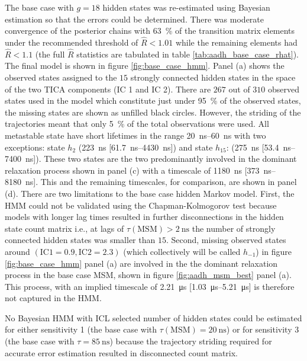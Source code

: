 The base case with $g=18$ hidden states was re-estimated using Bayesian estimation so that the errors could be determined.  There was moderate convergence of the posterior chains with \SI{63}{\percent} of the transition matrix elements under the recommended threshold of $\hat{R}<1.01$ while the remaining elements had $\hat{R}<1.1$ (the full $\hat{R}$ statistics  are tabulated in table \ref{tab:aadh_base_case_rhat}). The final model is shown in figure \ref{fig:base_case_hmm}. Panel (a) shows the observed states assigned to the $15$ strongly connected hidden states in the space of the two TICA components (IC 1 and IC 2). There are $267$ out of $310$ observed states used in the model which constitute just under \SI{95}{\percent} of the observed states, the missing states are shown as unfilled black circles. However, the striding of the trajectories meant that only \SI{5}{\percent} of the total observations were used. All metastable state have short lifetimes in the range \SIrange{20}{60}{\nano\second} with two exceptions: state $h_2$ (\SI{223}{\nano\second} [\SIrange[range-phrase=--]{61.7}{4430}{\nano\second}]) and state $h_{15}$: (\SI{275}{\nano\second} [\SIrange[range-phrase=--]{53.4}{7400}{\nano\second}]). These two states are the two predominantly involved in the dominant relaxation process shown in panel (c) with a timescale of \SI{1180}{\nano\second} [\SIrange[range-phrase=--]{373}{8180}{\nano\second}]. This and the remaining timescales,  for comparison,  are shown in panel (d). 
There are two limitations to the base case hidden Markov model. First, the HMM could not be validated using the Chapman-Kolmogorov test because models with longer lag times resulted in further disconnections in the hidden state count matrix i.e., at lags of $\tau(\mathrm{MSM})> \SI{2}{\nano\second}$ the number of strongly connected hidden states was smaller than $15$. Second, missing observed states around $(\mathrm{IC 1}=0.9, \mathrm{IC 2}=2.3)$ (which collectively will be called $h_{-1}$) in figure \ref{fig:base_case_hmm} panel (a) are involved in the the dominant relaxation process in the  base case MSM, shown in figure \ref{fig:aadh_msm_best} panel (a). This process, with an implied timescale of \SI{2.21}{\micro\second} [\SIrange[range-phrase=--]{1.03}{5.21}{\micro\second}] is therefore not captured in the HMM.

No Bayesian HMM with ICL selected number of hidden states could be estimated for either sensitivity 1 (the base case with $\tau(\mathrm{MSM})=\SI{20}{\nano\second}$) or for sensitivity 3 (the  base case with $\tau = \SI{85}{\nano\second}$) because the trajectory striding required for accurate error estimation resulted in disconnected count matrix.  

